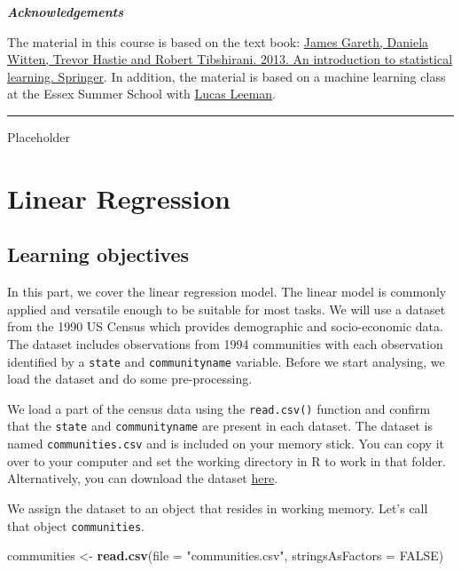 \documentclass[]{article}
\newenvironment{Shaded}{\begin{snugshade}}{\end{snugshade}}
\newcommand{\DataTypeTok}[1]{\textcolor[rgb]{0.13,0.29,0.53}{#1}}
\newcommand{\KeywordTok}[1]{\textcolor[rgb]{0.13,0.29,0.53}{\textbf{#1}}}
\newcommand{\NormalTok}[1]{#1}
\newcommand{\OtherTok}[1]{\textcolor[rgb]{0.56,0.35,0.01}{#1}}
\newcommand{\StringTok}[1]{\textcolor[rgb]{0.31,0.60,0.02}{#1}}
\begin{document}
\textbf{\emph{Acknowledgements}}

The material in this course is based on the text book: \href{http://faculty.marshall.usc.edu/gareth-james/ISL/ISLR\%20Seventh\%20Printing.pdf}{James Gareth, Daniela Witten, Trevor Hastie and Robert Tibshirani. 2013. An introduction to statistical learning. Springer}. In addition, the material is based on a machine learning class at the Essex Summer School with \href{https://lucasleemann.ch}{Lucas Leeman}.

\begin{center}\rule{0.5\linewidth}{\linethickness}\end{center}

Placeholder

\hypertarget{linear-regression}{%
\section{Linear Regression}\label{linear-regression}}

\hypertarget{learning-objectives}{%
\subsection{Learning objectives}\label{learning-objectives}}

In this part, we cover the linear regression model. The linear model is commonly applied and versatile enough to be suitable for most tasks. We will use a dataset from the 1990 US Census which provides demographic and socio-economic data. The dataset includes observations from 1994 communities with each observation identified by a \texttt{state} and \texttt{communityname} variable. Before we start analysing, we load the dataset and do some pre-processing.

We load a part of the census data using the \texttt{read.csv()} function and confirm that the \texttt{state} and \texttt{communityname} are present in each dataset. The dataset is named \texttt{communities.csv} and is included on your memory stick. You can copy it over to your computer and set the working directory in R to work in that folder. Alternatively, you can download the dataset \href{http://philippbroniecki.github.io/ML2017.io/data/communities.csv}{here}.

We assign the dataset to an object that resides in working memory. Let's call that object \texttt{communities}.

\begin{Shaded}
\begin{Highlighting}[]
\NormalTok{communities <-}\StringTok{ }\KeywordTok{read.csv}\NormalTok{(}\DataTypeTok{file =} \StringTok{"communities.csv"}\NormalTok{, }\DataTypeTok{stringsAsFactors =} \OtherTok{FALSE}\NormalTok{)}
\end{Highlighting}
\end{Shaded}
\end{document}
